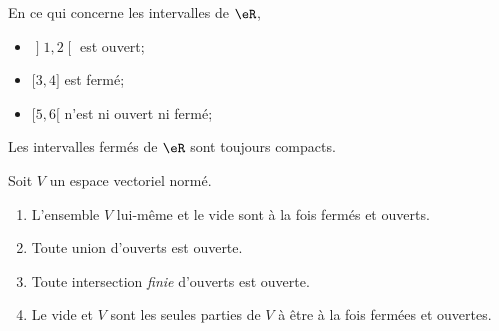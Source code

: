 \begin{example}		\label{ExempleFermeIntevrR}
	En ce qui concerne les intervalles de \( \eR\),
	\begin{itemize}
		\item \( \mathopen] 1 , 2 \mathclose[\) est ouvert;
		\item \( \mathopen[ 3,  4 \mathclose]\) est fermé;
		\item \( \mathopen[ 5 , 6 [\) n'est ni ouvert ni fermé;
	\end{itemize}
	Les intervalles fermés de \( \eR\) sont toujours compacts.
\end{example}

\begin{proposition}		\label{PropTopologieAx}
	Soit \( V\) un espace vectoriel normé.
	\begin{enumerate}
		\item
		      L'ensemble \( V\) lui-même et le vide sont à la fois fermés et ouverts.
		\item
		      Toute union d'ouverts est ouverte.
		\item
		      Toute intersection \emph{finie} d'ouverts est ouverte.
		\item		\label{ItemPropTopologieAxiv}
		      Le vide et \( V\) sont les seules parties de \( V\) à être à la fois fermées et ouvertes.
	\end{enumerate}
\end{proposition}

